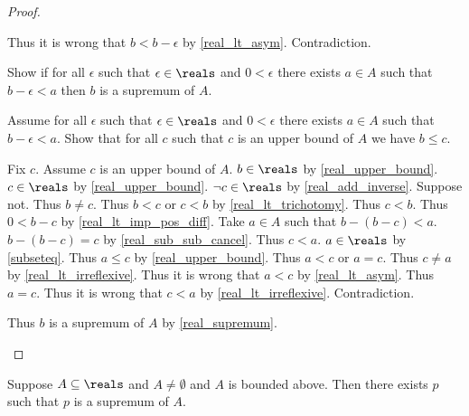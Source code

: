 \begin{proof}
\begin{subproof}
        Thus it is wrong that $b < b - \epsilon$ by \cref{real_lt_asym}.
        Contradiction.
    \end{subproof}
    Show if for all $\epsilon$ such that $\epsilon\in\reals$ and $0 < \epsilon$ there exists $a\in A$ such that $b - \epsilon < a$ then $b$ is a supremum of $A$.
    \begin{subproof}
        Assume for all $\epsilon$ such that $\epsilon\in\reals$ and $0 < \epsilon$ there exists $a\in A$ such that $b - \epsilon < a$.
        Show that for all $c$ such that $c$ is an upper bound of $A$ we have $b \leq c$.
        \begin{subproof}
            Fix $c$.
            Assume $c$ is an upper bound of $A$.
            $b\in\reals$ by \cref{real_upper_bound}.
            $c\in\reals$ by \cref{real_upper_bound}.
            $\neg{c}\in\reals$ by \cref{real_add_inverse}.
            Suppose not.
            Thus $b \neq c$.
            Thus $b < c$ or $c < b$ by \cref{real_lt_trichotomy}.
            Thus $c < b$.
            Thus $0 < b - c$ by \cref{real_lt_imp_pos_diff}.
            Take $a\in A$ such that $b - (b - c) < a$.
            $b - (b - c) = c$ by \cref{real_sub_sub_cancel}.
            Thus $c < a$.
            $a\in\reals$ by \cref{subseteq}.
            Thus $a \leq c$ by \cref{real_upper_bound}.
            Thus $a < c$ or $a = c$.
            Thus $c \neq a$ by \cref{real_lt_irreflexive}.
            Thus it is wrong that $a < c$ by \cref{real_lt_asym}.
            Thus $a = c$.
            Thus it is wrong that $c < a$ by \cref{real_lt_irreflexive}.
            Contradiction.
        \end{subproof}
        Thus $b$ is a supremum of $A$ by \cref{real_supremum}.
    \end{subproof}
\end{proof}

\begin{axiom}\label{real_completeness_axiom}
    Suppose $A\subseteq\reals$ and $A\neq \emptyset$ and $A$ is bounded above.
    Then there exists $p$ such that $p$ is a supremum of $A$.
\end{axiom}

